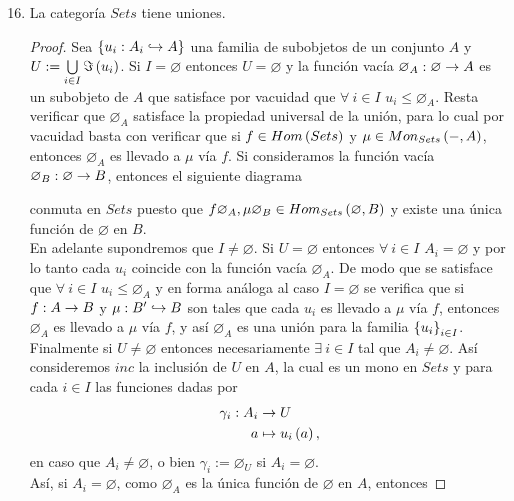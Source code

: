 \documentclass{article}
\begin{document}
	\begin{enumerate}[label=\textbf{Ej \arabic*.}]
	\setcounter{enumi}{15}
		\item La categoría $Sets$ tiene uniones.
		\begin{proof}
			Sea $\lrbrack{\catarrow{u_i}{A_i}{A}{m}}$ una familia de subobjetos de un conjunto $A$ y $U:=\bigcup\limits_{i\in I}\Im\left(u_i\right)$. Si $I=\varnothing$ entonces $U=\varnothing$ y la función vacía $\catarrow{\varnothing_{A}}{\varnothing}{A}{}$ es un subobjeto de $A$  que satisface por vacuidad que $\forall\ i\in I$ $u_i\leq \varnothing_A$. Resta verificar que $\varnothing_A$ satisface la propiedad universal de la unión, para lo cual por vacuidad basta con verificar que si $f\in Hom\left(Sets\right)$ y $\mu\in Mon_{Sets}\left(-,A\right)$, entonces $\varnothing_{A}$ es llevado a $\mu$ vía $f$. Si consideramos  la función vacía $\catarrow{\varnothing_B}{\varnothing}{B}{}$, entonces el siguiente diagrama
			\begin{center}
			\end{center}
			conmuta en $Sets$ puesto que $f\varnothing_A,\mu\varnothing_B\in Hom_{Sets}\left(\varnothing,B\right)$ y existe una única función de $\varnothing$ en $B$.\\
			En adelante supondremos que $I\neq\varnothing$. Si $U=\varnothing$ entonces $\forall\ i\in I$ $A_i=\varnothing$ y por lo tanto cada $u_i$ coincide con la función vacía $\varnothing_{A}$. De modo que se satisface que $\forall\ i\in I$ $u_i\leq \varnothing_{A}$ y en forma análoga al caso $I=\varnothing$ se verifica que si $\catarrow{f}{A}{B}{}$ y $\catarrow{\mu}{B'}{B}{m}$ son tales que cada $u_i$ es llevado a $\mu$ vía $f$, entonces $\varnothing_{A}$ es llevado a $\mu$ vía $f$, y así $\varnothing_{A}$ es una unión para la familia ${\left\{{u}_{i}\right\}}_{i\in I}$.\\
			Finalmente si $U\neq\varnothing$ entonces necesariamente $\exists\ i\in I$ tal que $A_i\neq\varnothing$. Así consideremos $inc$ la inclusión de $U$ en $A$, la cual es un mono en $Sets$ y para cada $i\in I$ las funciones dadas por
			\begin{align*}
				\gamma_i: A_i &\rightarrow U\\ a &\mapsto u_i\left(a\right),
			\end{align*}
			en caso que $A_i\neq\varnothing$, o bien $\gamma_i:=\varnothing_U$ si $A_i=\varnothing$.\\
			Así, si $A_i=\varnothing$, como $\varnothing_A$ es la única función de $\varnothing$ en $A$, entonces 

\end{proof}
\end{enumerate}
\end{document}
